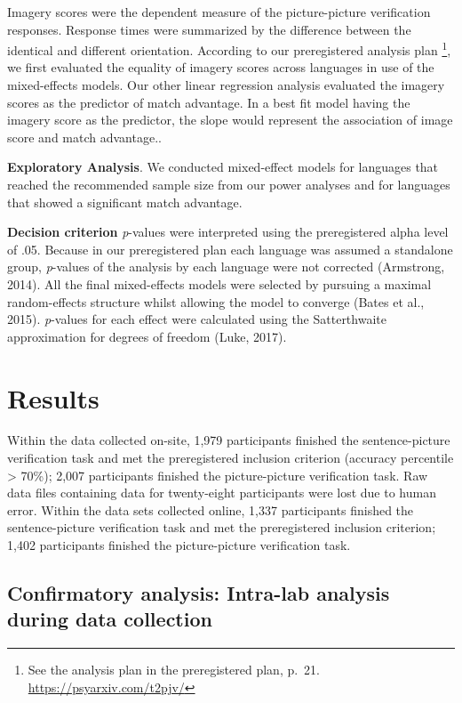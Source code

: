 \documentclass[
  man,floatsintext]{apa6}
\begin{document}
Imagery scores were the dependent measure of the picture-picture verification responses. Response times were summarized by the difference between the identical and different orientation. According to our preregistered analysis plan \footnote{See the analysis plan in the preregistered plan, p.~21. \url{https://psyarxiv.com/t2pjv/}}, we first evaluated the equality of imagery scores across languages in use of the mixed-effects models. Our other linear regression analysis evaluated the imagery scores as the predictor of match advantage. In a best fit model having the imagery score as the predictor, the slope would represent the association of image score and match advantage..

\textbf{Exploratory Analysis}. We conducted mixed-effect models for languages that reached the recommended sample size from our power analyses and for languages that showed a significant match advantage.

\textbf{Decision criterion} \emph{p}-values were interpreted using the preregistered alpha level of .05. Because in our preregistered plan each language was assumed a standalone group, \emph{p}-values of the analysis by each language were not corrected (Armstrong, 2014). All the final mixed-effects models were selected by pursuing a maximal random-effects structure whilst allowing the model to converge (Bates et al., 2015). \emph{p}-values for each effect were calculated using the Satterthwaite approximation for degrees of freedom (Luke, 2017).

\hypertarget{results}{%
\section{Results}\label{results}}

Within the data collected on-site, 1,979 participants finished the sentence-picture verification task and met the preregistered inclusion criterion (accuracy percentile \textgreater{} 70\%); 2,007 participants finished the picture-picture verification task. Raw data files containing data for twenty-eight participants were lost due to human error. Within the data sets collected online, 1,337 participants finished the sentence-picture verification task and met the preregistered inclusion criterion; 1,402 participants finished the picture-picture verification task.

\hypertarget{confirmatory-analysis-intra-lab-analysis-during-data-collection}{%
\subsection{Confirmatory analysis: Intra-lab analysis during data collection}\label{confirmatory-analysis-intra-lab-analysis-during-data-collection}}
\end{document}
